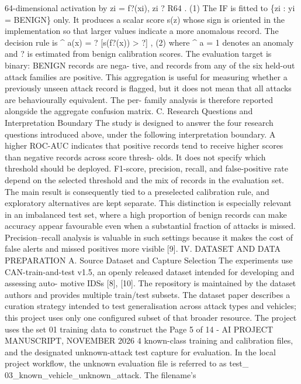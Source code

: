 \documentclass[
]{article}
\begin{document}
64-dimensional activation by zi = f?(xi), zi ? R64 . (1) The IF is
fitted to \{zi : yi = BENIGN\} only. It produces a scalar score s(z)
whose sign is oriented in the implementation so that larger values
indicate a more anomalous record. The decision rule is \textasciicircum{} a(x) = ?
{[}s(f?(x)) \textgreater{} ?{]} , (2) where \textasciicircum{} a = 1 denotes an anomaly
and ? is estimated from benign calibration scores. The evaluation target
is binary: BENIGN records are nega- tive, and records from any of the
six held-out attack families are positive. This aggregation is useful
for measuring whether a previously unseen attack record is flagged, but
it does not mean that all attacks are behaviourally equivalent. The per-
family analysis is therefore reported alongside the aggregate confusion
matrix. C. Research Questions and Interpretation Boundary The study is
designed to answer the four research questions introduced above, under
the following interpretation boundary. A higher ROC-AUC indicates that
positive records tend to receive higher scores than negative records
across score thresh- olds. It does not specify which threshold should be
deployed. F1-score, precision, recall, and false-positive rate depend on
the selected threshold and the mix of records in the evaluation set. The
main result is consequently tied to a preselected calibration rule, and
exploratory alternatives are kept separate. This distinction is
especially relevant in an imbalanced test set, where a high proportion
of benign records can make accuracy appear favourable even when a
substantial fraction of attacks is missed. Precision--recall analysis is
valuable in such settings because it makes the cost of false alerts and
missed positives more visible {[}9{]}. IV. DATASET AND DATA PREPARATION
A. Source Dataset and Capture Selection The experiments use
CAN-train-and-test v1.5, an openly released dataset intended for
developing and assessing auto- motive IDSs {[}8{]}, {[}10{]}. The
repository is maintained by the dataset authors and provides multiple
train/test subsets. The dataset paper describes a curation strategy
intended to test generalisation across attack types and vehicles; this
project uses only one configured subset of that broader resource. The
project uses the set 01 training data to construct the Page 5 of 14 - AI
PROJECT MANUSCRIPT, NOVEMBER 2026 4 known-class training and calibration
files, and the designated unknown-attack test capture for evaluation. In
the local project workflow, the unknown evaluation file is referred to
as test\_ 03\_known\_vehicle\_unknown\_attack. The filename's
\end{document}
